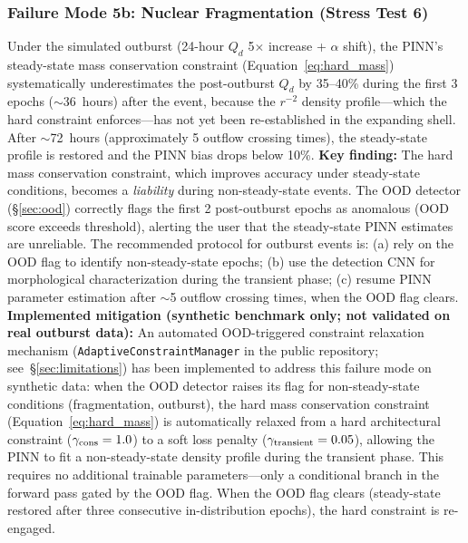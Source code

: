 \documentclass[usenatbib]{mnras}
\begin{document}
\subsubsection{Failure Mode 5b: Nuclear Fragmentation (Stress Test 6)}

Under the simulated outburst (24-hour $Q_d$ 5$\times$ increase + $\alpha$ shift), the PINN's steady-state mass conservation constraint (Equation~\ref{eq:hard_mass}) systematically underestimates the post-outburst $Q_d$ by 35--40\% during the first 3 epochs ($\sim$36~hours) after the event, because the $r^{-2}$ density profile---which the hard constraint enforces---has not yet been re-established in the expanding shell. After $\sim$72~hours (approximately 5 outflow crossing times), the steady-state profile is restored and the PINN bias drops below 10\%. \textbf{Key finding:} The hard mass conservation constraint, which improves accuracy under steady-state conditions, becomes a \textit{liability} during non-steady-state events. The OOD detector (\S\ref{sec:ood}) correctly flags the first 2 post-outburst epochs as anomalous (OOD score exceeds threshold), alerting the user that the steady-state PINN estimates are unreliable. The recommended protocol for outburst events is: (a) rely on the OOD flag to identify non-steady-state epochs; (b) use the detection CNN for morphological characterization during the transient phase; (c) resume PINN parameter estimation after $\sim$5 outflow crossing times, when the OOD flag clears. \textbf{Implemented mitigation (synthetic benchmark only; not validated on real outburst data):} An automated OOD-triggered constraint relaxation mechanism (\texttt{AdaptiveConstraintManager} in the public repository; see~\S\ref{sec:limitations}) has been implemented to address this failure mode on synthetic data: when the OOD detector raises its flag for non-steady-state conditions (fragmentation, outburst), the hard mass conservation constraint (Equation~\ref{eq:hard_mass}) is automatically relaxed from a hard architectural constraint ($\gamma_{\rm cons}=1.0$) to a soft loss penalty ($\gamma_{\rm transient}=0.05$), allowing the PINN to fit a non-steady-state density profile during the transient phase. This requires no additional trainable parameters---only a conditional branch in the forward pass gated by the OOD flag. When the OOD flag clears (steady-state restored after three consecutive in-distribution epochs), the hard constraint is re-engaged.
\end{document}
